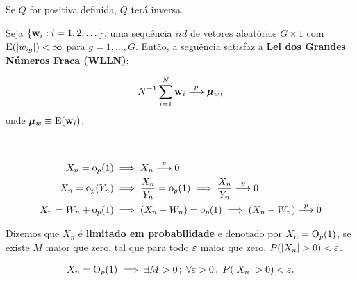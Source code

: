 \documentclass[11pt, oneside, a4paper, article]{article}
\numberwithin{equation}{section}
\begin{document}
\begin{description}
\begin{teo}
Se $Q$ for positiva definida, $Q$ terá inversa.
\end{teo}

\begin{teo} \label{teo:lgn:mat}
\citet[Teo 3.1, p.39 ]{wool-2010}

Seja $\{\mathbf{w}_{i} : i=1,2, \dots\}$, uma sequência $iid$ de vetores aleatórios $G \times 1$ com
$\text{E}(|w_{ig}|) < \infty$ para $g = 1, \dots, G$.
Então, a seguência satisfaz a \textbf{Lei dos Grandes Números Fraca (WLLN)}:

\vspace{-1 em}
\begin{align*}
N^{-1} \sum_{i=1}^{N}
\mathbf{w}_{i}  \overset{p}{\longrightarrow}  \boldsymbol{\mu}_{w},
\end{align*}
onde $\boldsymbol{\mu}_{w} \equiv \text{E}(\mathbf{w}_{i})$.
\end{teo}

\begin{defn}[$\litop$]
\item
\citet[Def 3.4, p.36 ]{wool-2010}\\
\citet[Lemma 3.2, p.36 ]{wool-2010}

\vspace{-1 em}
\begin{align*}
X_{n} = \text{o}_{p}(1) & \implies X_{n}  \overset{p}{\longrightarrow}  0
\\
X_{n} = \text{o}_{p}(Y_{n}) & \implies
\frac{X_{n}}{Y_{n}} = \text{o}_{p}(1) \implies
\frac{X_{n}}{Y_{n}}  \overset{p}{\longrightarrow}  0
\\
X_{n} = W_{n} + \text{o}_{p}(1) & \implies
(X_{n} - W_{n}) = \text{o}_{p}(1) \implies
(X_{n} - W_{n})  \overset{p}{\longrightarrow}  0
\end{align*}
\end{defn}

\begin{defn}
\citet[Def 3.3 (3), p.36 ]{wool-2010}

Dizemos que $X_{n}$ é \textbf{limitado em probabilidade} e denotado por 
$X_{n} = \text{O}_{p}(1)$,
se existe $M$ maior que zero, tal que para todo $\varepsilon$ maior que zero, $P( | X_{n} | > 0) < \varepsilon$.

\vspace{-1 em}
\begin{align*}
X_{n} = \text{O}_{p}(1) \implies \exists M > 0 \, ; \;
\forall \varepsilon > 0 \, , \;
P( | X_{n} | > 0) < \varepsilon.
\end{align*}
\end{defn}


\end{description}
\end{document}
